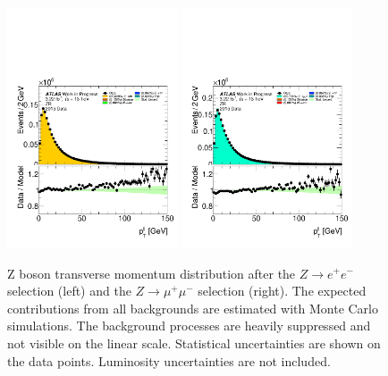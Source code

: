 \begin{figure}[htbp]
\centering
\includegraphics[width=0.45\textwidth]{figures/ZR/dataMc-dilep_pt-ZR-el.pdf}
\includegraphics[width=0.45\textwidth]{figures/ZR/dataMc-dilep_pt-ZR-mu.pdf}
\caption{
Z boson transverse momentum distribution after the $Z \rightarrow e^+e^-$ selection (left) and the $Z \rightarrow \mu^+\mu^-$  selection (right).
The expected contributions from all backgrounds are estimated with Monte Carlo simulations.
The background processes are heavily suppressed and not visible on the linear scale. 
Statistical uncertainties are shown on the data points.
Luminosity uncertainties are not included.
}
\label{fig:ZR_dilep_pt}
\end{figure}

